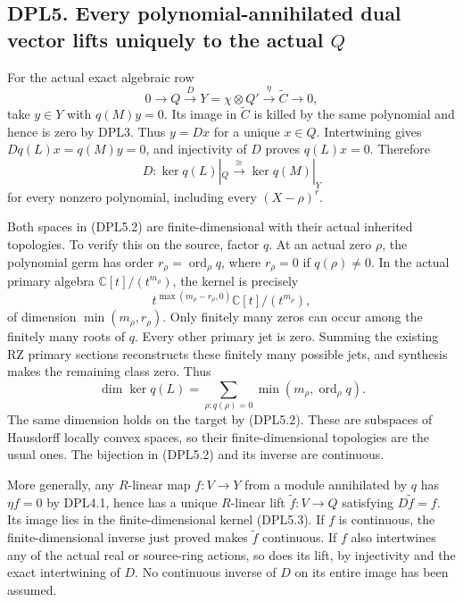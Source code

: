 \subsection{\texorpdfstring{DPL5. Every polynomial-annihilated dual
vector lifts uniquely to the actual
\(Q\)}{DPL5. Every polynomial-annihilated dual vector lifts uniquely to the actual Q}}\label{dpl5.-every-polynomial-annihilated-dual-vector-lifts-uniquely-to-the-actual-q}

For the actual exact algebraic row \[
0\longrightarrow Q\xrightarrow{D}Y=\chi\otimes Q'
\xrightarrow{\eta}\widetilde C\longrightarrow0,
\tag{DPL5.1}
\] take \(y\in Y\) with \(q(M)y=0\). Its image in \(\widetilde C\) is
killed by the same polynomial and hence is zero by DPL3. Thus \(y=Dx\)
for a unique \(x\in Q\). Intertwining gives \(Dq(L)x=q(M)y=0\), and
injectivity of \(D\) proves \(q(L)x=0\). Therefore \[
\boxed{
D:\ker q(L)|_Q\xrightarrow{\ \cong\ }\ker q(M)|_Y
}
\tag{DPL5.2}
\] for every nonzero polynomial, including every \((X-\rho)^r\).

Both spaces in (DPL5.2) are finite-dimensional with their actual
inherited topologies. To verify this on the source, factor \(q\). At an
actual zero \(\rho\), the polynomial germ has order
\(r_\rho=\operatorname{ord}_\rho q\), where \(r_\rho=0\) if
\(q(\rho)\ne0\). In the actual primary algebra
\(\mathbb C[t]/(t^{m_\rho})\), the kernel is precisely \[
t^{\max(m_\rho-r_\rho,0)}\mathbb C[t]/(t^{m_\rho}),
\tag{DPL5.3}
\] of dimension \(\min(m_\rho,r_\rho)\). Only finitely many zeros can
occur among the finitely many roots of \(q\). Every other primary jet is
zero. Summing the existing RZ primary sections reconstructs these
finitely many possible jets, and synthesis makes the remaining class
zero. Thus \[
\dim\ker q(L)=
\sum_{\rho:q(\rho)=0}\min(m_\rho,\operatorname{ord}_\rho q).
\tag{DPL5.4}
\] The same dimension holds on the target by (DPL5.2). These are
subspaces of Hausdorff locally convex spaces, so their
finite-dimensional topologies are the usual ones. The bijection in
(DPL5.2) and its inverse are continuous.

More generally, any \(R\)-linear map \(f:V\to Y\) from a module
annihilated by \(q\) has \(\eta f=0\) by DPL4.1, hence has a unique
\(R\)-linear lift \(\widetilde f:V\to Q\) satisfying
\(D\widetilde f=f\). Its image lies in the finite-dimensional kernel
(DPL5.3). If \(f\) is continuous, the finite-dimensional inverse just
proved makes \(\widetilde f\) continuous. If \(f\) also intertwines any
of the actual real or source-ring actions, so does its lift, by
injectivity and the exact intertwining of \(D\). No continuous inverse
of \(D\) on its entire image has been assumed.

